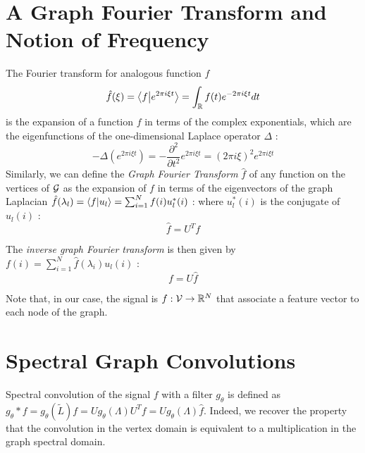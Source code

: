 \documentclass[sigconf]{acmart}
\begin{document}
\section{A Graph Fourier Transform and Notion of Frequency}
The Fourier transform for analogous function $f$
$$
\hat{f}(\xi) = \left \langle f \middle| e^{2\pi i\xi t} \right \rangle = \int_{\mathbb{R}} f(t)e^{-2\pi i \xi t}dt
$$
is the expansion of a function $f$ in terms of the complex exponentials, which are the eigenfunctions of the one-dimensional Laplace operator $\Delta$ :
$$
-\Delta (e^{2\pi i \xi t}) = -\frac{\partial^2}{\partial t^2} e^{2\pi i \xi t} = (2\pi i\xi)^2 e^{2\pi i \xi t}
$$
Similarly, we can define the \textit{Graph Fourier Transform} $\hat{f}$ of any function on the vertices of $\mathcal{G}$ as the expansion of $f$ in terms of the eigenvectors of the graph Laplacian $\hat{f}(\lambda_l) = \left \langle f \middle| u_l \right \rangle = \sum_{i=1}^{N} f(i)u_l^*(i)$ : 
where $u_l^*(i)$ is the conjugate of $u_l(i)$ : 
\begin{equation}
    \hat{f} = U^Tf
\end{equation}

The \textit{inverse graph Fourier transform} is then given by $f(i) = \sum_{i=1}^{N} \hat{f}(\lambda_i)u_l(i)$ : 
\begin{equation}
    f = U\hat{f}
\end{equation}

Note that, in our case, the signal is $f:\mathcal{V}\rightarrow\mathbb{R}^N$ that associate a feature vector to each node of the graph.

\section{Spectral Graph Convolutions }

Spectral convolution of the signal $f$ with a filter $g_\theta$ is defined as $g_\theta * f = g_\theta(\widetilde{L})f = Ug_\theta(\Lambda)U^Tf = U g_\theta(\Lambda)\hat{f}$. 
Indeed, we recover the property that the convolution in the vertex domain is equivalent to a multiplication in the graph spectral domain.
\end{document}
